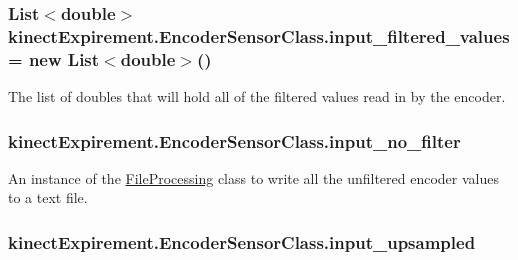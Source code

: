 \subsubsection[{\texorpdfstring{input\+\_\+filtered\+\_\+values}{input_filtered_values}}]{\setlength{\rightskip}{0pt plus 5cm}List$<$double$>$ kinect\+Expirement.\+Encoder\+Sensor\+Class.\+input\+\_\+filtered\+\_\+values = new List$<$double$>$()}\hypertarget{classkinect_expirement_1_1_encoder_sensor_class_a19b9e4e6fe72872dcab2c82a91470c3a}{}\label{classkinect_expirement_1_1_encoder_sensor_class_a19b9e4e6fe72872dcab2c82a91470c3a}


The list of doubles that will hold all of the filtered values read in by the encoder. 

\subsubsection[{\texorpdfstring{input\+\_\+no\+\_\+filter}{input_no_filter}}]{ kinect\+Expirement.\+Encoder\+Sensor\+Class.\+input\+\_\+no\+\_\+filter}\hypertarget{classkinect_expirement_1_1_encoder_sensor_class_a37bd8f02067e70fcb1ae1c2a97e86aed}{}\label{classkinect_expirement_1_1_encoder_sensor_class_a37bd8f02067e70fcb1ae1c2a97e86aed}


An instance of the {\ttfamily \hyperlink{classkinect_expirement_1_1_file_processing}{File\+Processing}} class to write all the unfiltered encoder values to a text file. 

\subsubsection[{\texorpdfstring{input\+\_\+upsampled}{input_upsampled}}]{ kinect\+Expirement.\+Encoder\+Sensor\+Class.\+input\+\_\+upsampled}\hypertarget{classkinect_expirement_1_1_encoder_sensor_class_a71c4a0ef65acb2048fc85ff7ecb3f79f}{}\label{classkinect_expirement_1_1_encoder_sensor_class_a71c4a0ef65acb2048fc85ff7ecb3f79f}


